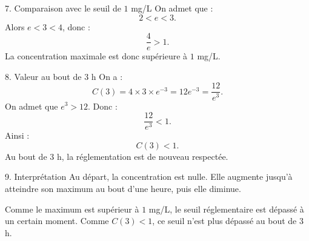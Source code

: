 \documentclass[11pt,a4paper]{article}
\begin{document}
\begin{correctionbox}{7. Comparaison avec le seuil de $1$ mg/L}
On admet que :
\[
 2<e<3.
\]
Alors $e<3<4$, donc :
\[
 \frac4e>1.
\]
La concentration maximale est donc supérieure à $1$ mg/L.
\end{correctionbox}

\begin{correctionbox}{8. Valeur au bout de $3$ h}
On a :
\[
 C(3)=4\times3\times e^{-3}=12e^{-3}=\frac{12}{e^3}.
\]
On admet que $e^3>12$. Donc :
\[
 \frac{12}{e^3}<1.
\]
Ainsi :
\[
 \boxed{C(3)<1}.
\]
Au bout de $3$ h, la réglementation est de nouveau respectée.
\end{correctionbox}

\begin{correctionbox}{9. Interprétation}
Au départ, la concentration est nulle. Elle augmente jusqu'à atteindre son maximum au bout d'une heure, puis elle diminue.

Comme le maximum est supérieur à $1$ mg/L, le seuil réglementaire est dépassé à un certain moment. Comme $C(3)<1$, ce seuil n'est plus dépassé au bout de $3$ h.
\end{correctionbox}
\end{document}
